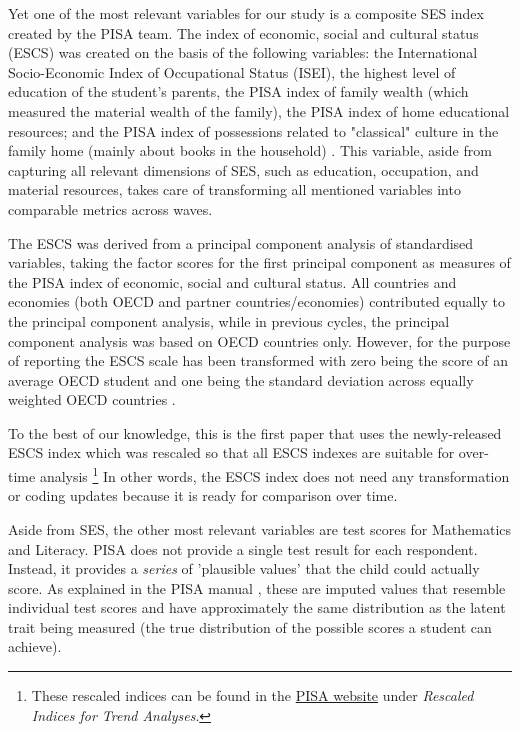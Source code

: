 \documentclass[11pt, a4paper]{article}\usepackage[]{graphicx}\usepackage[]{color}
\begin{document}
Yet one of the most relevant variables for our study is a composite SES index created by the PISA team. The index of economic, social and cultural status (ESCS) was created on the basis of the following variables: the International Socio-Economic Index of Occupational Status (ISEI), the highest level of education of the student’s parents, the PISA index of family wealth (which measured the material wealth of the family), the PISA index of home educational resources; and the PISA index of possessions related to "classical" culture in the family home (mainly about books in the household) \citep{oecd_glance_2002}. This variable, aside from capturing all relevant dimensions of SES, such as education, occupation, and material resources, takes care of transforming all mentioned variables into comparable metrics across waves. 

The ESCS was derived from a principal component analysis of standardised variables, taking the factor scores for the first principal component as measures of the PISA index of economic, social and cultural status. All countries and economies (both OECD and partner countries/economies) contributed equally to the principal component analysis, while in previous cycles, the principal component analysis was based on OECD countries only. However, for the purpose of reporting the ESCS scale has been transformed with zero being the score of an average OECD student and one being the standard deviation across equally weighted OECD countries \citep{pisa_2015_results}.

To the best of our knowledge, this is the first paper that uses the newly-released ESCS index \citep{pisa_2015_results} which was rescaled so that all ESCS indexes are suitable for over-time analysis \footnote{These rescaled indices can be found in the \href{http://www.oecd.org/pisa/data/2015database/}{PISA website} under \emph{Rescaled Indices for Trend Analyses}.} In other words, the ESCS index does not need any transformation or coding updates because it is ready for comparison over time.

Aside from SES, the other most relevant variables are test scores for Mathematics and Literacy. PISA does not provide a single test result for each respondent. Instead, it provides a \emph{series} of 'plausible values' that the child could actually score. As explained in the PISA manual \citep{pisa2012_technical}, these are imputed values that resemble individual test scores and have approximately the same distribution as the latent trait being measured (the true distribution of the possible scores a student can achieve). 
\end{document}
